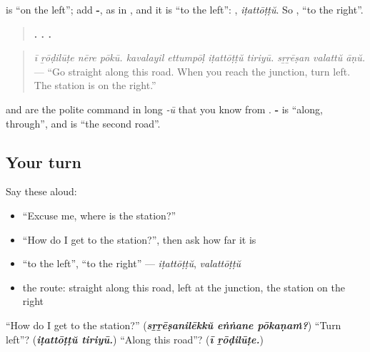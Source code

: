 \begin{grammarlens}[title={Grammar Lens: following the answer}]
\textbf{} is \textquotedblleft{}on the left\textquotedblright{}; add \textbf{-}, as in \textbf{}, and it is \textquotedblleft{}to the left\textquotedblright{}: \textbf{}, \emph{iṭattōṭṭŭ}. So \textbf{}, \textquotedblleft{}to the right\textquotedblright{}.

\begin{quote}
\textbf{   .    .   .}
\end{quote}

\begin{quote}
\emph{ī ṟōḍilūṭe nēre pōkū. kavalayil ettumpōḷ iṭattōṭṭŭ tiriyū. sṟṟēṣan valattŭ āṇŭ.} — \textquotedblleft{}Go straight along this road. When you reach the junction, turn left. The station is on the right.\textquotedblright{}
\end{quote}

\textbf{} and \textbf{} are the polite command in long \emph{-ū} that you know from \textbf{}. \textbf{-} is \textquotedblleft{}along, through\textquotedblright{}, and \textbf{ } is \textquotedblleft{}the second road\textquotedblright{}.
\end{grammarlens}

\subsection*{Your turn}
Say these aloud:

\begin{itemize}
\raggedright
  \item \textquotedblleft{}Excuse me, where is the station?\textquotedblright{}
  \item \textquotedblleft{}How do I get to the station?\textquotedblright{}, then ask how far it is
  \item \textquotedblleft{}to the left\textquotedblright{}, \textquotedblleft{}to the right\textquotedblright{} — \emph{iṭattōṭṭŭ}, \emph{valattōṭṭŭ}
  \item the route: straight along this road, left at the junction, the station on the right
\end{itemize}

\begin{tcolorbox}[breakable,colback=teal!4,colframe=teal!35!black,title={Before you move on}]
\textquotedblleft{}How do I get to the station?\textquotedblright{} (\emph{\textbf{sṟṟēṣanilēkkŭ eṅṅane pōkaṇaṁ?}}) \textquotedblleft{}Turn left\textquotedblright{}? (\emph{\textbf{iṭattōṭṭŭ tiriyū.}}) \textquotedblleft{}Along this road\textquotedblright{}? (\emph{\textbf{ī ṟōḍilūṭe.}})
\end{tcolorbox}
